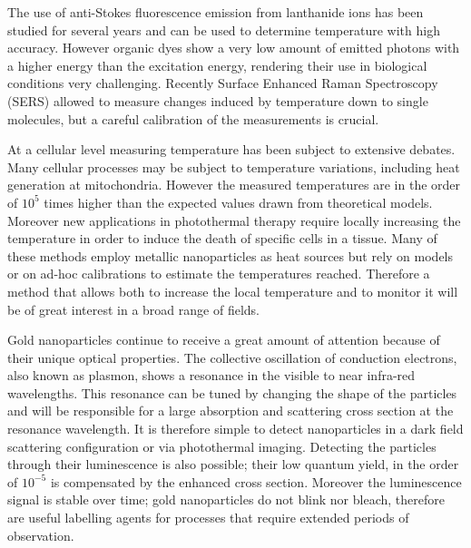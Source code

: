 The use of anti-Stokes fluorescence emission from lanthanide ions has been
studied for several years\cite{Auzel2004a} and can be used to determine
temperature with high accuracy. However organic dyes show a very low amount of
emitted photons with a higher energy than the excitation energy, rendering their
use in biological conditions very challenging. Recently Surface Enhanced Raman
Spectroscopy (SERS) allowed to measure changes induced by temperature down
to single molecules\cite{Pozzi2015}, but a careful calibration of the
measurements is crucial.

At a cellular level measuring temperature has been subject to extensive
debates\cite{Yang2011a,Suzuki2015}. Many cellular processes may be subject to
temperature variations, including heat generation at mitochondria. However the
measured temperatures\cite{Yang2011a} are in the order of $10^5$ times higher
than the expected values drawn from theoretical models\cite{Sato2014}.
Moreover new applications in photothermal therapy require locally increasing the
temperature in order to induce the death of specific cells in a
tissue\cite{Huang2008,Huang2006}. Many of these methods employ metallic
nanoparticles as heat sources\cite{Gobin2007,Hirsch2003} but rely on
models\cite{Zhao2014a} or on ad-hoc calibrations to estimate the temperatures
reached\cite{Donner2013}. Therefore a method that allows both to increase the
local temperature and to monitor it will be of great interest in a broad range
of fields.

Gold nanoparticles continue to receive a great amount of attention because of
their unique optical properties\cite{Zijlstra2011}. The collective oscillation
of conduction electrons, also known as plasmon, shows a resonance in the visible to
near infra-red wavelengths. This resonance can be tuned by changing the shape of
the particles\cite{Carattino2016} and will be responsible for a large absorption
and scattering cross section at the resonance wavelength. It is therefore simple
to detect nanoparticles in a dark field scattering\cite{Hu2008} configuration or
via photothermal imaging\cite{Berciaud2006}. Detecting the particles through
their luminescence\cite{Tcherniak2011} is also possible; their low quantum
yield\cite{Fang2012,Rao2015,Yorulmaz2012,Cheng2015}, in the order of $10^{-5}$
is compensated by the enhanced cross section. Moreover the luminescence signal
is stable over time; gold nanoparticles do not blink nor bleach, therefore are 
useful labelling agents for processes that require extended periods of
observation\cite{Wang2005}.

